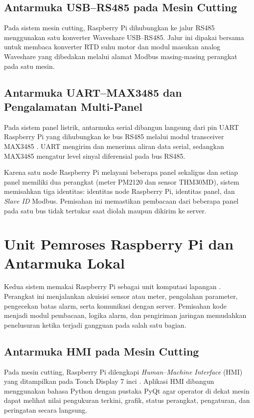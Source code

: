 \subsection{Antarmuka USB--RS485 pada Mesin Cutting}

Pada sistem mesin cutting, Raspberry Pi dihubungkan ke jalur RS485 menggunakan satu konverter Waveshare USB--RS485. Jalur ini dipakai bersama untuk membaca konverter RTD suhu motor dan modul masukan analog Waveshare yang dibedakan melalui alamat Modbus masing-masing perangkat pada satu mesin.

\subsection{Antarmuka UART--MAX3485 dan Pengalamatan Multi-Panel}

Pada sistem panel listrik, antarmuka serial dibangun langsung dari pin UART Raspberry Pi yang dihubungkan ke bus RS485 melalui modul transceiver MAX3485 \citep{max3485}. UART mengirim dan menerima aliran data serial, sedangkan MAX3485 mengatur level sinyal diferensial pada bus RS485.

Karena satu node Raspberry Pi melayani beberapa panel sekaligus dan setiap panel memiliki dua perangkat (meter PM2120 dan sensor THM30MD), sistem memisahkan tiga identitas: identitas node Raspberry Pi, identitas panel, dan \textit{Slave ID} Modbus. Pemisahan ini memastikan pembacaan dari beberapa panel pada satu bus tidak tertukar saat diolah maupun dikirim ke server.

\section{Unit Pemroses Raspberry Pi dan Antarmuka Lokal}

Kedua sistem memakai Raspberry Pi sebagai unit komputasi lapangan \citep{raspberrypi}. Perangkat ini menjalankan akuisisi sensor atau meter, pengolahan parameter, pengecekan batas alarm, serta komunikasi dengan server. Pemisahan kode menjadi modul pembacaan, logika alarm, dan pengiriman jaringan memudahkan penelusuran ketika terjadi gangguan pada salah satu bagian.

\subsection{Antarmuka HMI pada Mesin Cutting}

Pada mesin cutting, Raspberry Pi dilengkapi \textit{Human--Machine Interface} (HMI) yang ditampilkan pada Touch Display 7 inci \citep{touchdisplay}. Aplikasi HMI dibangun menggunakan bahasa Python dengan pustaka PyQt \citep{pyqt} agar operator di dekat mesin dapat melihat nilai pengukuran terkini, grafik, status perangkat, pengaturan, dan peringatan secara langsung.

